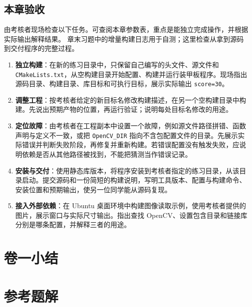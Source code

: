 \documentclass[
  lang=cn,
  scheme=chinese,
  chinesefont=ctexfont,
  11pt,
  oneside,
  device=normal,
  color=cyan,
  mode=fancy
]{../templates/elegantbook}
\begin{document}
\section{本章验收}
由考核者现场检查以下任务。可查阅本章参数表，重点是能独立完成操作，并根据实际输出解释结果。
章末习题中的增量构建日志用于自测；这里检查从拿到源码到交付程序的完整过程。
\begin{enumerate}
    \item \textbf{独立构建}：在新的练习目录中，只保留自己编写的头文件、源文件和 \texttt{CMakeLists.txt}，从空构建目录开始配置、构建并运行装甲板程序。现场指出源码目录、构建目录、库目标和可执行目标，展示实际输出 \texttt{score=30}。
    \item \textbf{调整工程}：按考核者给定的新目标名修改构建描述，在另一个空构建目录中构建。先说出预期产物的位置，再运行验证；说明每处目标名修改的用途。
    \item \textbf{定位故障}：由考核者在工程副本中设置一个故障，例如源文件路径拼错、函数声明与定义不一致，或把 \texttt{OpenCV\_DIR} 指向不含包配置文件的目录。先展示实际错误并判断失败阶段，再修复并重新构建。若错误配置没有触发失败，应说明依赖是否从其他路径被找到，不能把猜测当作错误记录。
    \item \textbf{安装与交付}：使用静态库版本，将程序安装到考核者指定的练习目录，从该目录启动。提交源码和一份简短的构建说明，写明工具版本、配置与构建命令、安装位置和预期输出，使另一位同学能从源码复现。
    \item \textbf{接入外部依赖}：在 Ubuntu 桌面环境中构建图像读取示例，使用考核者提供的图片，展示窗口与实际尺寸输出。指出查找 OpenCV、设置包含目录和链接库分别是哪条配置，并解释三者的用途。
\end{enumerate}

\endgroup



\chapter*{卷一小结}


\appendix



\chapter*{参考题解}

\end{document}
